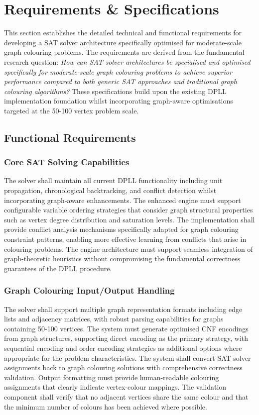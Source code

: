 \section{Requirements \& Specifications}

This section establishes the detailed technical and functional requirements for developing a SAT solver architecture specifically optimised for moderate-scale graph colouring problems. The requirements are derived from the fundamental research question: \emph{How can SAT solver architectures be specialised and optimised specifically for moderate-scale graph colouring problems to achieve superior performance compared to both generic SAT approaches and traditional graph colouring algorithms?} These specifications build upon the existing DPLL implementation foundation whilst incorporating graph-aware optimisations targeted at the 50-100 vertex problem scale.

\subsection{Functional Requirements}

\subsubsection{Core SAT Solving Capabilities}
The solver shall maintain all current DPLL functionality including unit propagation, chronological backtracking, and conflict detection whilst incorporating graph-aware enhancements. The enhanced engine must support configurable variable ordering strategies that consider graph structural properties such as vertex degree distribution and saturation levels. The implementation shall provide conflict analysis mechanisms specifically adapted for graph colouring constraint patterns, enabling more effective learning from conflicts that arise in colouring problems. The engine architecture must support seamless integration of graph-theoretic heuristics without compromising the fundamental correctness guarantees of the DPLL procedure.

\subsubsection{Graph Colouring Input/Output Handling}
The solver shall support multiple graph representation formats including edge lists and adjacency matrices, with robust parsing capabilities for graphs containing 50-100 vertices. The system must generate optimised CNF encodings from graph structures, supporting direct encoding as the primary strategy, with sequential encoding and order encoding strategies as additional options where appropriate for the problem characteristics. The system shall convert SAT solver assignments back to graph colouring solutions with comprehensive correctness validation. Output formatting must provide human-readable colouring assignments that clearly indicate vertex-colour mappings. The validation component shall verify that no adjacent vertices share the same colour and that the minimum number of colours has been achieved where possible.

